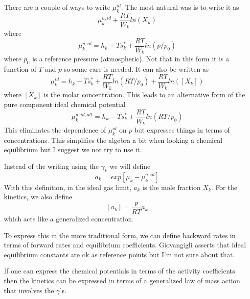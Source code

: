 \documentclass[11pt]{article}
\begin{document}
There are a couple of ways to write $\mu_k^{id}$.
The most natural was is to write it as
\[
\mu_k^{u,id} + \frac{R T}{W_k} ln (X_k)
\]
where 
\begin{equation}
\mu_k^{u,id} = h_k - T s_k^* + \frac{R T}{W_k} ln(p/p_0)
\label{eq:chem_uid_frac}
\end{equation}
where $p_0$ is a reference pressure (atmospheric).
Not that in this form it is a function of $T$ and $p$ so some care is needed.
It can also be written as
\begin{equation}
\mu_k^{id} = h_k - T s_k^* + \frac{R T}{W_k} ln(RT/p_0) + \frac{R T}{W_k} ln([X_k])
\end{equation}
where $[X_k]$ is the molar concentration.
This leads to an alternative form of the pure component ideal chemical potential
\begin{equation}
\mu_k^{u,id,alt} = h_k - T s_k^* + \frac{R T}{W_k} ln(RT/p_0)
\label{eq:chem_uid_conc}
\end{equation}
This eliminates the dependence of $\mu_k^{id}$ on $p$ but expresses things in terms of
concentrations.  This simplifies the algebra a bit when looking a chemical equilibrium but
I suggest we not try to use it.

Instead of the writing using the $\gamma_k$ we will define
\begin{equation}
a_k = exp[\mu_k - \mu_k^{u,id}]
\label{eq:deviate_ideal}
\end{equation}
With this definition, in the ideal gas limit, $a_k$ is the mole fraction $X_k$. For the kinetics,
we also define
\[
[a_k] = \frac{p}{R T}  a_k
\]
which acts like a generalized concentration.

To express this in the more traditional form, we can define backward rates in terms of forward rates
and equilibrium coefficients.  Giovangigli asserts that ideal equilibrium constants are ok as 
reference points but I'm not sure about that.

If one can express the chemical potentials in terms of the activity coefficients then the 
kinetics can be expressed in terms of a generalized law of mass action that involves the $\gamma$'s.
\end{document}
